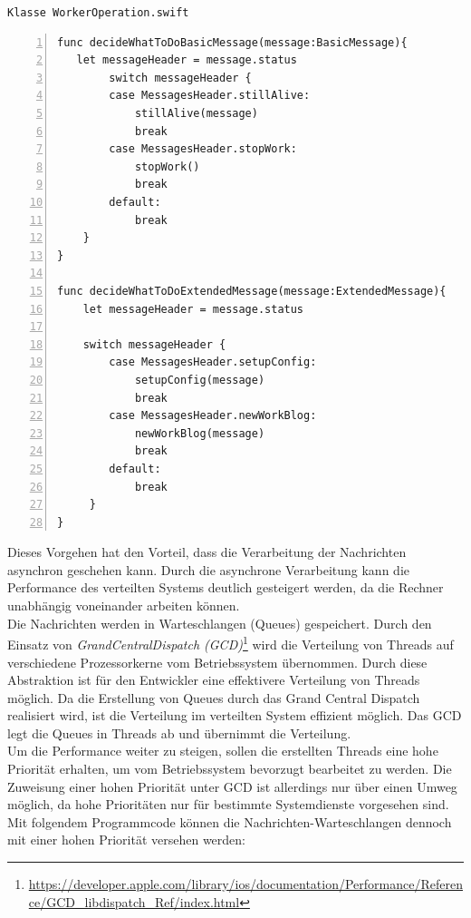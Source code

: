 \texttt{Klasse WorkerOperation.swift}
\begin{lstlisting}[basicstyle=\ttfamily,numbers=left,numberstyle=\footnotesize\ttfamily,backgroundcolor=\color{sourcegray}]
func decideWhatToDoBasicMessage(message:BasicMessage){
   let messageHeader = message.status
        switch messageHeader {
        case MessagesHeader.stillAlive:
            stillAlive(message)
            break
        case MessagesHeader.stopWork:
            stopWork()
            break
        default:
            break
    }
}

func decideWhatToDoExtendedMessage(message:ExtendedMessage){
    let messageHeader = message.status
    
    switch messageHeader {
        case MessagesHeader.setupConfig:
            setupConfig(message)
            break
        case MessagesHeader.newWorkBlog:
            newWorkBlog(message)
            break
        default:
            break
     }
}
\end{lstlisting}

Dieses Vorgehen hat den Vorteil, dass die Verarbeitung der Nachrichten asynchron geschehen kann. Durch die asynchrone Verarbeitung kann die Performance des verteilten Systems deutlich gesteigert werden, da die Rechner unabhängig voneinander arbeiten können. \\
Die Nachrichten werden in Warteschlangen (Queues) gespeichert. Durch den Einsatz von \emph{GrandCentralDispatch (GCD)}\footnote{\url{https://developer.apple.com/library/ios/documentation/Performance/Reference/GCD_libdispatch_Ref/index.html}} wird die Verteilung von Threads auf verschiedene Prozessorkerne vom Betriebssystem übernommen. Durch diese Abstraktion ist für den Entwickler eine effektivere Verteilung von Threads möglich. Da die Erstellung von Queues durch das Grand Central Dispatch realisiert wird, ist die Verteilung im verteilten System effizient möglich. Das GCD legt die Queues in Threads ab und übernimmt die Verteilung. \\
Um die Performance weiter zu steigen, sollen die erstellten Threads eine hohe Priorität erhalten, um vom Betriebssystem bevorzugt bearbeitet zu werden. Die Zuweisung einer hohen Priorität unter GCD ist allerdings nur über einen Umweg möglich, da hohe Prioritäten nur für bestimmte Systemdienste vorgesehen sind. Mit folgendem Programmcode können die Nachrichten-Warteschlangen dennoch mit einer hohen Priorität versehen werden:


